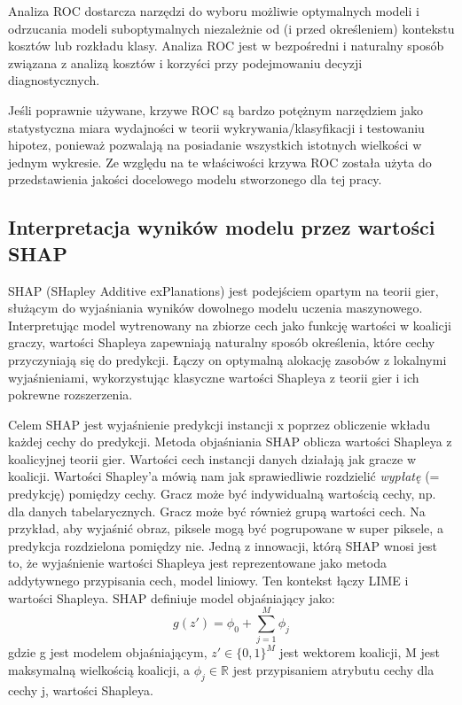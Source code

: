 \documentclass[polish, twoside, 12pt, a4paper]{article}
\theoremstyle{definition}
\theoremstyle{plain}
\theoremstyle{remark}
\begin{document}
Analiza ROC dostarcza narzędzi do wyboru możliwie optymalnych modeli i odrzucania modeli suboptymalnych niezależnie od (i przed określeniem) kontekstu kosztów lub rozkładu klasy. Analiza ROC jest w bezpośredni i naturalny sposób związana z analizą kosztów i korzyści przy podejmowaniu decyzji diagnostycznych.\cite{fawcett2005}

Jeśli poprawnie używane, krzywe ROC są bardzo potężnym narzędziem jako statystyczna miara wydajności w teorii wykrywania/klasyfikacji i testowaniu hipotez, ponieważ pozwalają na posiadanie wszystkich istotnych wielkości w jednym wykresie. Ze względu na te właściwości krzywa ROC została użyta do przedstawienia jakości docelowego modelu stworzonego dla tej pracy.

\subsection{Interpretacja wyników modelu przez wartości SHAP}

SHAP (SHapley Additive exPlanations) jest podejściem opartym na teorii gier, służącym do wyjaśniania wyników dowolnego modelu uczenia maszynowego. Interpretując model wytrenowany na zbiorze cech jako funkcję wartości w koalicji graczy, wartości Shapleya zapewniają naturalny sposób określenia, które cechy przyczyniają się do predykcji. Łączy on optymalną alokację zasobów z lokalnymi wyjaśnieniami, wykorzystując klasyczne wartości Shapleya z teorii gier i ich pokrewne rozszerzenia.

Celem SHAP jest wyjaśnienie predykcji instancji x poprzez obliczenie wkładu każdej cechy do predykcji. Metoda objaśniania SHAP oblicza wartości Shapleya z koalicyjnej teorii gier. Wartości cech instancji danych działają jak gracze w koalicji. Wartości Shapley'a mówią nam jak sprawiedliwie rozdzielić \emph{wypłatę} (= predykcję) pomiędzy cechy. Gracz może być indywidualną wartością cechy, np. dla danych tabelarycznych. Gracz może być również grupą wartości cech. Na przykład, aby wyjaśnić obraz, piksele mogą być pogrupowane w super piksele, a predykcja rozdzielona pomiędzy nie. Jedną z innowacji, którą SHAP wnosi jest to, że wyjaśnienie wartości Shapleya jest reprezentowane jako metoda addytywnego przypisania cech, model liniowy. Ten kontekst łączy LIME i wartości Shapleya. SHAP definiuje model objaśniający jako:
\[ g(z') =  \phi_0 + \sum_{j=1}^{M}\phi_j \]
gdzie g jest modelem objaśniającym, \( z'\in\{0,1\}^{M}\)  jest wektorem koalicji, M jest maksymalną wielkością koalicji, a \( \phi_j \in\mathbb{R}\) jest przypisaniem atrybutu cechy dla cechy j, wartości Shapleya. \cite{lundberg2017}
\end{document}
